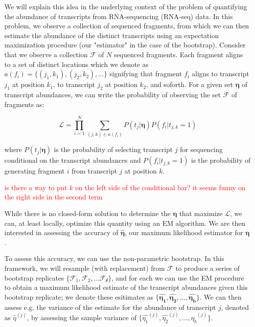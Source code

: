 We will explain this idea in the underlying context of the problem of quantifying the abundance 
of transcripts from RNA-sequencing (RNA-seq) data.  In this problem, we observe a collection of 
sequenced fragments, from which we can then estimate the abundance of the distinct transcripts 
using an expectation maximization procedure (our "estimator" in the case of the bootstrap).  
Consider that we observe a collection $\mathcal{F}$ of $N$ sequenced fragments. Each fragment aligns 
to a set of distinct locations which we denote as $a(f_i) = \{(j_1, k_1), (j_2, k_2), \dots\}$ 
signifying that fragment $f_i$ aligns to transcript $j_1$ at position $k_1$, to transcript $j_2$ 
at position $k_2$, and soforth.  For a given set $\mathbf{\eta}$ of transcript abundances, we can 
write the probability of observing the set $\mathcal{F}$ of fragments as:

$$
\mathcal{L} = \prod_{i=1}^{N} \sum_{(j,k) \in a(f_i)} P(t_j|\mathbf{\eta}) P(f_i|t_{j,k}=1)
$$

where $P(t_j|\mathbf{\eta})$ is the probability of selecting transcript $j$ for sequencing 
conditional on the transcript abundances and $P(f_i|t_{j,k}=1)$ is the probability of generating 
fragment $i$ from transcript $j$ at position $k$.

\textcolor{red}{is there a way to put $k$ on the left side of the conditional bar? it seems funny on the 
right side in the second term}

While there is no closed-form solution to determine the $\mathbf{\eta}$ that maximize $\mathcal{L}$, 
we can, at least locally, optimize this quantity using an EM algorithm.  We are then interested in 
assessing the accuracy of $\mathbf{\hat{\eta}}$, our maximum likelihood estimator for $\mathbf{\eta}$.

To assess this accuracy, we can use the non-parametric bootstrap. In this framework, we will 
resample (with replacement) from $\mathcal{F}$ to produce a series of bootstrap replicates 
$\{\mathcal{F_1}, \mathcal{F_2}, \dots \mathcal{F_b}\}$, and for each we can use the EM procedure 
to obtain a maximum likelihood estimate of the transcript abundances given this bootstrap replicate; 
we denote these esitimates as 
$\{\mathbf{\hat{\eta_1}}, \mathbf{\hat{\eta_2}}, \dots, \mathbf{\hat{\eta_b}}\}$. 
We can then assess e.g. the variance of the estimate for the abundance of transcript $j$, denoted as 
$\hat{\eta}^{(j)}$, by assessing the sample variance of 
$\{ \hat{\eta_1}^{(j)}, \hat{\eta_2}^{(j)}, \dots, \hat{\eta_b}^{(j)} \}$.

